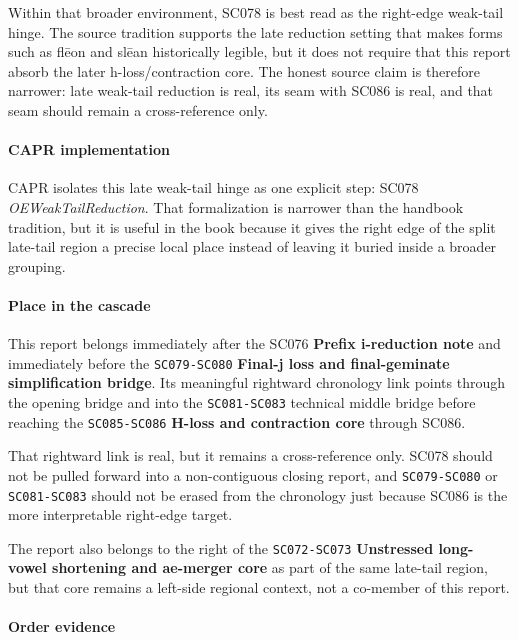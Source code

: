 \documentclass[
  british,
  a4paper,
]{article}
\begin{document}
Within that broader environment, SC078 is best read as the right-edge
weak-tail hinge. The source tradition supports the late reduction
setting that makes forms such as flēon and slēan historically legible,
but it does not require that this report absorb the later
h-loss/contraction core. The honest source claim is therefore narrower:
late weak-tail reduction is real, its seam with SC086 is real, and that
seam should remain a cross-reference only.

\paragraph{CAPR implementation}\label{capr-implementation-48}

CAPR isolates this late weak-tail hinge as one explicit step: SC078
\emph{OEWeakTailReduction}. That formalization is narrower than the
handbook tradition, but it is useful in the book because it gives the
right edge of the split late-tail region a precise local place instead
of leaving it buried inside a broader grouping.

\paragraph{Place in the cascade}\label{place-in-the-cascade-48}

This report belongs immediately after the SC076 \textbf{Prefix
i-reduction note} and immediately before the \texttt{SC079-SC080}
\textbf{Final-j loss and final-geminate simplification bridge}. Its
meaningful rightward chronology link points through the opening bridge
and into the \texttt{SC081-SC083} technical middle bridge before
reaching the \texttt{SC085-SC086} \textbf{H-loss and contraction core}
through SC086.

That rightward link is real, but it remains a cross-reference only.
SC078 should not be pulled forward into a non-contiguous closing report,
and \texttt{SC079-SC080} or \texttt{SC081-SC083} should not be erased
from the chronology just because SC086 is the more interpretable
right-edge target.

The report also belongs to the right of the \texttt{SC072-SC073}
\textbf{Unstressed long-vowel shortening and ae-merger core} as part of
the same late-tail region, but that core remains a left-side regional
context, not a co-member of this report.

\paragraph{Order evidence}\label{order-evidence-48}
\end{document}

